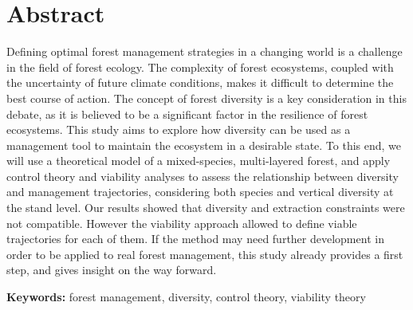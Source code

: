 \section*{Abstract}

Defining optimal forest management strategies in a changing world is a challenge in the field of forest ecology. The complexity of forest ecosystems, coupled with the uncertainty of future climate conditions, makes it difficult to determine the best course of action. The concept of forest diversity is a key consideration in this debate, as it is believed to be a significant factor in the resilience of forest ecosystems. This study aims to explore how diversity can be used as a management tool to maintain the ecosystem in a desirable state. To this end, we will use a theoretical model of a mixed-species, multi-layered forest, and apply control theory and viability analyses to assess the relationship between diversity and management trajectories, considering both species and vertical diversity at the stand level. Our results showed that diversity and extraction constraints were not compatible. However the viability approach allowed to define viable trajectories for each of them. If the method may need further development in order to be applied to real forest management, this study already provides a first step, and gives insight on the way forward.

\noindent \textbf{Keywords:} forest management, diversity, control theory, viability theory